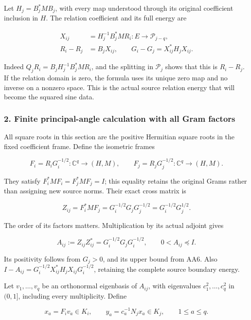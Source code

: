 \documentclass{article}
\begin{document}
Let \(H_j=B_j^*M B_j\), with every map understood through its original coefficient inclusion in \(H\). The relation coefficient and its full energy are

\[
\begin{aligned}
X_{ij}&=H_j^{-1}B_j^*M R_i:E\to\mathcal P_{j-q},\\
R_i-R_j&=B_jX_{ij},\qquad
G_i-G_j=X_{ij}^*H_jX_{ij}.
\end{aligned}
\tag{AA7}
\]

Indeed \(Q_jR_i=B_jH_j^{-1}B_j^*MR_i\), and the splitting in \(\mathcal P_j\) shows that this is \(R_i-R_j\). If the relation domain is zero, the formula uses its unique zero map and no inverse on a nonzero space. This is the actual source relation energy that will become the squared sine data.

\subsubsection{2. Finite principal-angle calculation with all Gram factors}\label{endpoint-all_degree_angle_review--finite-principal-angle-calculation-with-all-gram-factors}

All square roots in this section are the positive Hermitian square roots in the fixed coefficient frame. Define the isometric frames

\[
F_i=R_iG_i^{-1/2}:\mathbb C^q\to(H,M),\qquad
F_j=R_jG_j^{-1/2}:\mathbb C^q\to(H,M).
\tag{AA8}
\]

They satisfy \(F_i^*MF_i=F_j^*MF_j=I\); this equality retains the original Grams rather than assigning new source norms. Their exact cross matrix is

\[
Z_{ij}=F_i^*MF_j
=G_i^{-1/2}G_jG_j^{-1/2}
=G_i^{-1/2}G_j^{1/2}.
\tag{AA9}
\]

The order of its factors matters. Multiplication by its actual adjoint gives

\[
A_{ij}:=Z_{ij}Z_{ij}^*
=G_i^{-1/2}G_jG_i^{-1/2},
\qquad 0<A_{ij}\preceq I.
\tag{AA10}
\]

Its positivity follows from \(G_j>0\), and its upper bound from AA6. Also \(I-A_{ij}=G_i^{-1/2}X_{ij}^*H_jX_{ij}G_i^{-1/2}\), retaining the complete source boundary energy.

Let \(v_1,\ldots,v_q\) be an orthonormal eigenbasis of \(A_{ij}\), with eigenvalues \(c_1^2,\ldots,c_q^2\) in \((0,1]\), including every multiplicity. Define

\[
x_a=F_iv_a\in K_i,\qquad
y_a=c_a^{-1}N_jx_a\in K_j,
\qquad 1\le a\le q.
\tag{AA11}
\]
\end{document}
